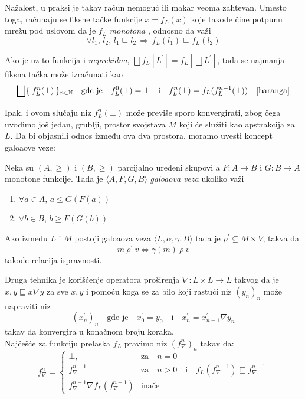 Nažalost, u praksi je takav račun nemoguć ili makar veoma zahtevan. Umesto toga, računaju se fiksne tačke funkcije $x = f_{L}(x)$ koje takođe čine potpunu mrežu pod uslovom da je $f_{L}$ \emph{monotona} \cite{tarski}, odnosno da važi $$\forall l_{1},\, l_{2},\, l_{1} \sqsubseteq l_{2} \, \Rightarrow \, f_{L}(l_1) \sqsubseteq f_{L}(l_2)$$ 

 Ako je uz to funkcija i \emph{neprekidna}, $\bigsqcup f_{L}[L^{\prime}] = f_{L}[\bigsqcup L^{\prime}]$, tada se najmanja fiksna tačka može izračunati kao $$\bigsqcup \{ \: f^{n}_{L}(\bot)\: \}_{n \in \mathbb{N}} \quad \text{gde je} \quad f^{0}_{L}(\bot) = \bot \quad \text{i} \quad f^{n}_{L}(\bot) = f_{L}(f^{n-1}_{L}(\bot)) \quad \cite{baranga}$$

Ipak, i ovom slučaju niz $f^{n}_{L} ( \bot )$ može previše sporo konvergirati, zbog čega uvodimo još jedan, grublji, prostor svojstava $M$ koji će služiti kao apstrakcija za $L$. Da bi objasnili odnos između ova dva prostora, moramo uvesti koncept galoaove veze:
\begin{definicija}
Neka su $(A, \geqslant)$ i $(B, \geqslant)$ parcijalno uređeni skupovi a $F : A \rightarrow B$ i $G : B \rightarrow A$ monotone funkcije. Tada je $\langle A, 	F, G, B \rangle$ \emph{galoaova veza} ukoliko važi 
\begin{enumerate}
\item $\forall a \in A, \, a \leqslant G (F (a))$ 
\item $\forall b \in B, \, b \geqslant F (G (b))$
\end{enumerate}
\end{definicija} 

\begin{teorema}
Ako između $L$ i $M$ postoji galoaova veza $\langle L, \alpha, \gamma, B \rangle$ tada je $\rho^{\prime} \subseteq M \times V$, takva da $$m\: \rho^{\prime}\: v \iff \gamma (m)\: \rho \: v$$ takođe relacija ispravnosti.
\end{teorema}

Druga tehnika je korišćenje operatora proširenja $\nabla : L \times L \rightarrow L$ takvog da je $x, y \sqsubseteq x \nabla y$ za sve $x, y$ i pomoću koga se za bilo koji rastući niz $(y_{n})_{n}$ može napraviti niz $$(x^{\prime}_{n})_{n} \quad \text{gde je} \quad x^{\prime}_{0} = y_{0} \quad \text{i} \quad x^{\prime}_{n} = x^{\prime}_{n-1} \nabla y_{n} $$ takav da konvergira u konačnom broju koraka. \\

Najčešće za funkciju prelaska $f_{L}$ pravimo niz $(f^{n}_{\nabla})_{n}$ takav da:
$$
f^{n}_{\nabla} = 
\begin{cases}
\bot,            								  & 	\text{za} \quad n = 0 \\
f^{n-1}_{\nabla} 							      & \text{za} \quad n > 0 \quad \text{i} \quad f_{L}(f^{n-1}_{\nabla}) \sqsubseteq f^{n-1}_{\nabla} \\
f^{n-1}_{\nabla} \nabla f_{L}(f^{n-1}_{\nabla})  & \text{inače}
\end{cases}
$$

